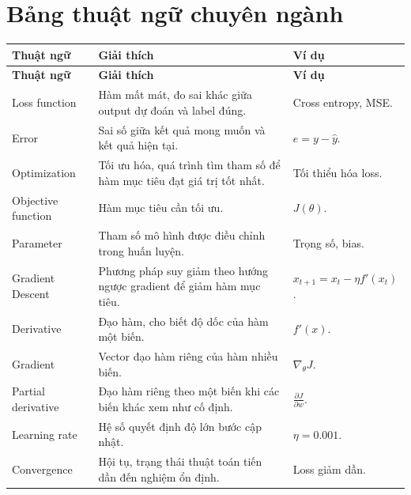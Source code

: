 \documentclass[12pt,a4paper]{report}
\begin{document}
\chapter{Bảng thuật ngữ chuyên ngành}

\small
\begin{longtable}{p{}p{}p{}}
\toprule
\textbf{Thuật ngữ} & \textbf{Giải thích} & \textbf{Ví dụ} \\
\midrule
\endfirsthead

\toprule
\textbf{Thuật ngữ} & \textbf{Giải thích} & \textbf{Ví dụ} \\
\midrule
\endhead

Loss function & Hàm mất mát, đo sai khác giữa output dự đoán và label đúng. & Cross entropy, MSE. \\

Error & Sai số giữa kết quả mong muốn và kết quả hiện tại. & $e=y-\hat{y}$. \\

Optimization & Tối ưu hóa, quá trình tìm tham số để hàm mục tiêu đạt giá trị tốt nhất. & Tối thiểu hóa loss. \\

Objective function & Hàm mục tiêu cần tối ưu. & $J(\theta)$. \\

Parameter & Tham số mô hình được điều chỉnh trong huấn luyện. & Trọng số, bias. \\

Gradient Descent & Phương pháp suy giảm theo hướng ngược gradient để giảm hàm mục tiêu. & $x_{t+1}=x_t-\eta f'(x_t)$. \\

Derivative & Đạo hàm, cho biết độ dốc của hàm một biến. & $f'(x)$. \\

Gradient & Vector đạo hàm riêng của hàm nhiều biến. & $\nabla_\theta J$. \\

Partial derivative & Đạo hàm riêng theo một biến khi các biến khác xem như cố định. & $\frac{\partial J}{\partial w}$. \\

Learning rate & Hệ số quyết định độ lớn bước cập nhật. & $\eta=0.001$. \\

Convergence & Hội tụ, trạng thái thuật toán tiến dần đến nghiệm ổn định. & Loss giảm dần. \\


\end{longtable}
\end{document}
